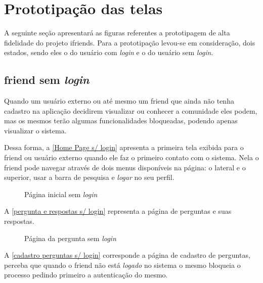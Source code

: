 \chapter{Prototipação das telas}
\label{prototipação}
A seguinte seção apresentará as figuras referentes a prototipagem de alta fidelidade do projeto \gls{ifriends}. Para a prototipação levou-se em consideração, dois estados, sendo eles o do usuário com \textit{login} e o do usuário sem \textit{login}. 

\section{\gls{friend} sem \textit{login}}
Quando um usuário externo ou até mesmo um \gls{friend} que ainda não tenha cadastro na aplicação decidirem visualizar ou conhecer a comunidade eles podem, mas os mesmos terão algumas funcionalidades bloqueadas, podendo apenas visualizar o sistema.

Dessa forma, a \autoref{Home Page s/ login} apresenta a primeira tela exibida para o \gls{friend} ou usuário externo quando ele faz o primeiro contato com o sistema. Nela o \gls{friend} pode navegar através de dois menus disponíveis na página: o lateral e o superior, usar a barra de pesquisa e \textit{logar} no seu perfil.

\begin{figure}[htb]
\centering
\caption{\label{Home Page s/ login} Página inicial sem \textit{login}}

\end{figure}
\FloatBarrier

A \autoref{pergunta e respostas s/ login} representa a página de perguntas e suas respostas.

\begin{figure}[htb]
\centering
\caption{\label{pergunta e respostas s/ login} Página da pergunta sem \textit{login}}

\end{figure}
\FloatBarrier

A \autoref{cadastro perguntas s/ login} corresponde a página de cadastro de perguntas, perceba que quando o \gls{friend} não está \textit{logado} no sistema o mesmo bloqueia o processo pedindo primeiro a autenticação do mesmo.

